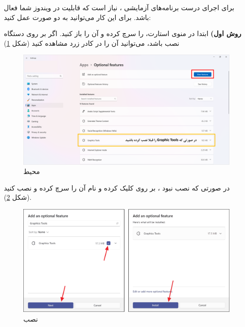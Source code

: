 {
    \Large
    \begin{spacing}{1.5}
        برای اجرای درست برنامه‌های آزمایشی ، نیاز است که قابلیت  در ویندوز شما فعال باشد.
        برای این کار می‌توانید به دو صورت عمل کنید:

        \textbf{روش اول)}
        ابتدا در منوی استارت،  را سرچ کرده و آن را باز کنید.
        اگر  بر روی دستگاه نصب باشد، می‌توانید آن را در کادر زرد مشاهده کنید (شکل \ref{fig:3.Intro.4.1})

        \begin{figure}[H]
            \centering
            \setlength{\belowcaptionskip}{-10pt}
            \includegraphics[width=\textwidth]{Images/3/3.Intro.4.1}
            \caption{محیط }
            \label{fig:3.Intro.4.1}
        \end{figure}

        در صورتی که نصب نبود ، بر روی  کلیک کرده و نام آن را سرچ کرده و نصب کنید (شکل \ref{fig:3.Intro.4.2}).

        \begin{figure}[H]
            \centering
            \setlength{\belowcaptionskip}{-10pt}
            \includegraphics[width=\textwidth]{Images/3/3.Intro.4.2}
            \caption{نصب }
            \label{fig:3.Intro.4.2}
        \end{figure}


\end{spacing}}

